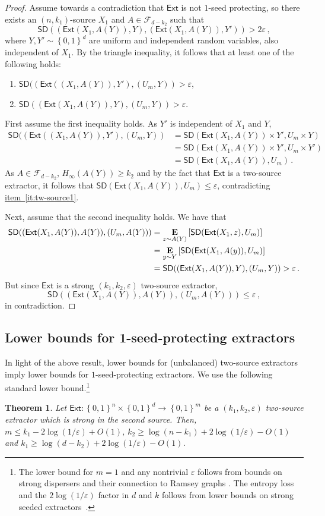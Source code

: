 \documentclass[11pt]{article}
\numberwithin{equation}{section}
\newtheorem{theorem}{Theorem}[section]
\theoremstyle{definition}
\theoremstyle{plain}
\newcommand{\expeqref}[2]{\hyperref[#2]{#1~\eqref{#2}}}
\newcommand{\ext}{\mathsf{Ext}}
\newcommand{\adv}{A}
\newcommand{\eps}{\varepsilon}
\newcommand{\set}[1]{\left\{{#1}\right\}}
\newcommand{\B}{\set{0,1}}
\newcommand{\E}{\mathop{\bf E\/}}
\newcommand{\advfampart}{\mathcal{F}}
\newcommand{\minent}[1]{H_{\infty}(#1)}
\def\SD{\ensuremath{\mathsf{SD}}}
\begin{document}
\begin{proof}
Assume towards a contradiction that $\ext$ is not $1$-seed protecting,
so there exists an $(n,k_1)$-source $X_1$ and $\adv \in \advfampart_{d-k_2}$
such that
	\[
	\SD((\ext(X_1,\adv(Y)), Y), (\ext(X_1,\adv(Y)), Y')) > 2\eps\,,
	\]
where $Y, Y' \sim \B^d$ are uniform and independent random variables, also
independent of $X_1$.
	By the triangle inequality, it follows that at least one of the following holds:
\begin{enumerate}
\item\label{it:tw-source1} $\SD((\ext((X_1,A(Y)), Y'), (U_{m}, Y)) > \eps$,
\item $\SD((\ext(X_1,A(Y)), Y), (U_{m}, Y)) > \eps$.
\end{enumerate}	
First assume the first inequality holds. As $Y'$ is independent of $X_1$ and $Y$,
\begin{align*}
\SD((\ext((X_1,A(Y)), Y'), (U_{m}, Y)) &= 
\SD(\ext(X_1,A(Y)) \times Y', U_m \times Y) \\
&= \SD(\ext(X_1,A(Y)) \times Y', U_m \times Y') \\ &= \SD(\ext(X_1,A(Y)) , U_m)\,.
\end{align*}
As $\adv \in \advfampart_{d-k_2}$, $\minent{\adv(Y)} \ge k_2$ and by the fact that $\ext$ is a two-source extractor, it follows that  $\SD(\ext(X_1,A(Y)) , U_m) \le \eps$,
contradicting \expeqref{item}{it:tw-source1}.
	
Next, assume that the second inequality holds.
We have that 
\begin{align*}
	\SD((\ext(X_1,\adv(Y)), \adv(Y)), (U_{m}, \adv(Y))) &= \E_{z \sim \adv(Y)}\left[ \SD(\ext(X_1,z),U_{m}) \right] \\
	&= \E_{y \sim Y}\left[ \SD(\ext(X_1,\adv(y)),U_{m}) \right] \\
	&=\SD((\ext(X_1,\adv(Y)), Y), (U_{m}, Y)) > \eps\,.
\end{align*}
But since $\ext$ is a strong $(k_1,k_2,\eps)$ two-source extractor,
\[\SD((\ext(X_1,\adv(Y)), \adv(Y)), (U_{m}, \adv(Y))) \le \eps\,,\] in contradiction.
\end{proof}

\subsection{Lower bounds for 1-seed-protecting extractors}

%
In light of the above result, lower bounds for (unbalanced) two-source 
extractors imply lower bounds for $1$-seed-protecting extractors.
We use the following standard lower bound.\footnote{The lower bound for
$m = 1$ and any nontrivial $\eps$ follows from bounds on strong dispersers
and their connection to Ramsey graphs \cite{RTS00,BDT20}. The entropy loss
and the $2\log(1/\eps)$ factor in $d$ and $k$ follows from lower bounds
on strong seeded extractors~\cite{RTS00}.}
\begin{theorem}
Let $\ext \colon \B^{n} \times \B^{d} \rightarrow \B^{m}$ be a 
$(k_1,k_2,\eps)$ two-source extractor which is strong in the second source. Then,
$m \le k_1 - 2\log(1/\eps)+O(1)$, $k_2 \ge \log(n-k_1)+2\log(1/\eps)-O(1)$
and $k_1 \ge \log(d-k_2)+2\log(1/\eps)-O(1)$.
\end{theorem}
\end{document}
